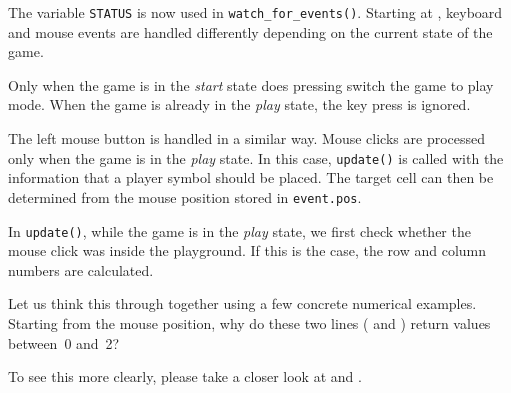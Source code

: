 
The variable \texttt{STATUS} is now used in \texttt{watch\_for\_events()}. Starting at , keyboard and mouse events are handled differently depending on the current state of the game.

Only when the game is in the \emph{start} state does pressing  switch the game to play mode. When the game is already in the \emph{play} state, the key press is ignored.

The left mouse button is handled in a similar way. Mouse clicks are processed only when the game is in the \emph{play} state. In this case, \texttt{update()} is called with the information that a player symbol should be placed. The target cell can then be determined from the mouse position stored in \texttt{event.pos}.


\begin{figure}%
	\begin{center}%
		\vspace{-2em}%
	\end{center}%
\end{figure}%
In \texttt{update()}, while the game is in the \emph{play} state, we first check whether the mouse click was inside the playground. If this is the case, the row and column numbers are calculated.

Let us think this through together using a few concrete numerical examples. Starting from the mouse position, why do these two lines ( and ) return values between~0 and~2? 

To see this more clearly, please take a closer look at  and .


